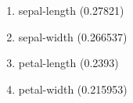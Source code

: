 \begin{enumerate}
\item sepal-length (0.27821)
\item sepal-width (0.266537)
\item petal-length (0.2393)
\item petal-width (0.215953)
\end{enumerate}